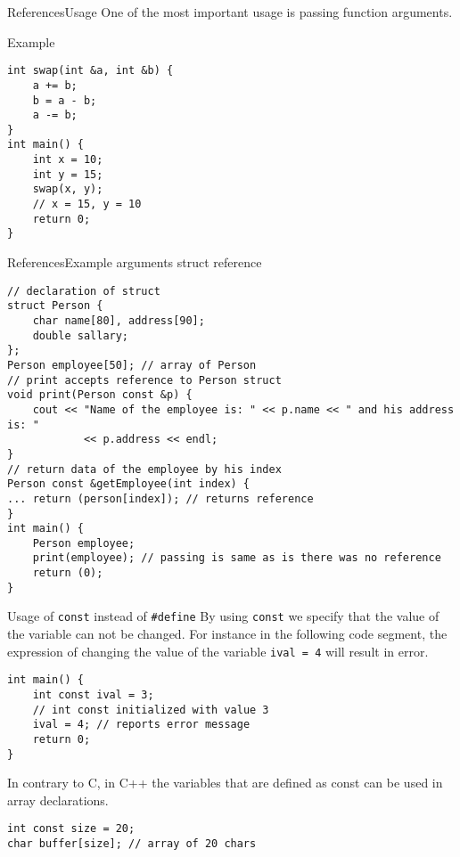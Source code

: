 \begin{frame}[fragile]{References}{Usage}
One of the most important usage is passing function arguments.
\begin{exampleblock}{Example}
\begin{lstlisting}
int swap(int &a, int &b) {
    a += b;
    b = a - b;
    a -= b;
}
int main() {
    int x = 10;
    int y = 15;
    swap(x, y);
    // x = 15, y = 10
    return 0;
}
\end{lstlisting}
\end{exampleblock}
\end{frame}

\begin{frame}[fragile]{References}{Example arguments struct reference}
\begin{lstlisting}
// declaration of struct
struct Person {
    char name[80], address[90];
    double sallary;
};
Person employee[50]; // array of Person 
// print accepts reference to Person struct
void print(Person const &p) {
    cout << "Name of the employee is: " << p.name << " and his address is: "
            << p.address << endl;
}
// return data of the employee by his index
Person const &getEmployee(int index) {
... return (person[index]); // returns reference
}
int main() {
    Person employee;
    print(employee); // passing is same as is there was no reference
    return (0);
}
\end{lstlisting}
\end{frame}

\begin{frame}[fragile]{Usage of \texttt{const} instead of \texttt{\#define}}
By using \texttt{const} we specify that the value of the variable can not be
changed. For instance in the following code segment, the expression of changing
the value of the variable \texttt{ival = 4} will result in error.
\begin{lstlisting}
int main() {
    int const ival = 3;
    // int const initialized with value 3
    ival = 4; // reports error message
    return 0;
}
\end{lstlisting}
In contrary to C, in C++ the variables that are defined as const can be used in
array declarations.
\begin{lstlisting}
int const size = 20;
char buffer[size]; // array of 20 chars
\end{lstlisting}
\end{frame}

